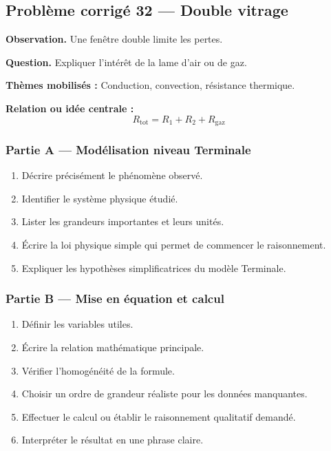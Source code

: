 \documentclass[11pt,a4paper]{article}
\begin{document}
\subsection{Problème corrigé 32 — Double vitrage}

\begin{exercicebox}
\textbf{Observation.} Une fenêtre double limite les pertes.

\medskip
\textbf{Question.} Expliquer l'intérêt de la lame d'air ou de gaz.

\medskip
\textbf{Thèmes mobilisés :} Conduction, convection, résistance thermique.

\medskip
\textbf{Relation ou idée centrale :}
\[
R_{\mathrm{tot}}=R_1+R_2+R_{\mathrm{gaz}}
\]
\end{exercicebox}

\subsubsection*{Partie A — Modélisation niveau Terminale}

\begin{enumerate}
  \item Décrire précisément le phénomène observé.
  \item Identifier le système physique étudié.
  \item Lister les grandeurs importantes et leurs unités.
  \item Écrire la loi physique simple qui permet de commencer le raisonnement.
  \item Expliquer les hypothèses simplificatrices du modèle Terminale.
\end{enumerate}

\subsubsection*{Partie B — Mise en équation et calcul}

\begin{enumerate}
  \item Définir les variables utiles.
  \item Écrire la relation mathématique principale.
  \item Vérifier l'homogénéité de la formule.
  \item Choisir un ordre de grandeur réaliste pour les données manquantes.
  \item Effectuer le calcul ou établir le raisonnement qualitatif demandé.
  \item Interpréter le résultat en une phrase claire.
\end{enumerate}
\end{document}
